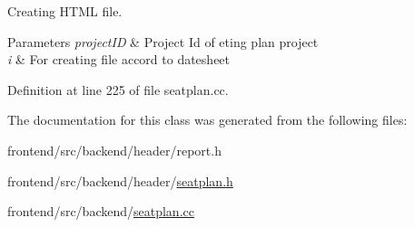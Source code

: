 \-Creating \-H\-T\-M\-L file. 


\begin{DoxyParams}{\-Parameters}
{\em project\-I\-D} & \-Project \-Id of eting plan project \\
\hline
{\em i} & \-For creating file accord to datesheet \\
\hline
\end{DoxyParams}


\-Definition at line 225 of file seatplan.\-cc.



\-The documentation for this class was generated from the following files\-:\begin{DoxyCompactItemize}
\item 
frontend/src/backend/header/report.\-h\item 
frontend/src/backend/header/\hyperlink{seatplan_8h}{seatplan.\-h}\item 
frontend/src/backend/\hyperlink{seatplan_8cc}{seatplan.\-cc}\end{DoxyCompactItemize}
